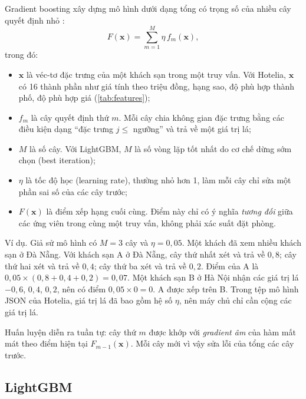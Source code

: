 Gradient boosting xây dựng mô hình dưới dạng tổng có trọng số của nhiều cây quyết định nhỏ \cite{friedman2001}:
\begin{equation}
  F(\mathbf{x}) = \sum_{m=1}^{M} \eta\, f_m(\mathbf{x}),
  \label{eq:gbdt}
\end{equation}
trong đó:
\begin{itemize}
\item $\mathbf{x}$ là véc-tơ đặc trưng của một khách sạn trong một truy vấn. Với Hotelia, $\mathbf{x}$ có 16 thành phần như giá tính theo triệu đồng, hạng sao, độ phù hợp thành phố, độ phù hợp giá (\cref{tab:features});
\item $f_m$ là cây quyết định thứ $m$. Mỗi cây chia không gian đặc trưng bằng các điều kiện dạng ``đặc trưng $j \le$ ngưỡng'' và trả về một giá trị lá;
\item $M$ là số cây. Với LightGBM, $M$ là số vòng lặp tốt nhất do cơ chế dừng sớm chọn (best iteration);
\item $\eta$ là tốc độ học (learning rate), thường nhỏ hơn 1, làm mỗi cây chỉ sửa một phần sai số của các cây trước;
\item $F(\mathbf{x})$ là điểm xếp hạng cuối cùng. Điểm này chỉ có ý nghĩa \emph{tương đối} giữa các ứng viên trong cùng một truy vấn, không phải xác suất đặt phòng.
\end{itemize}

Ví dụ. Giả sử mô hình có $M = 3$ cây và $\eta = 0{,}05$. Một khách đã xem nhiều khách sạn ở Đà Nẵng. Với khách sạn A ở Đà Nẵng, cây thứ nhất xét  và trả về $0{,}8$; cây thứ hai xét  và trả về $0{,}4$; cây thứ ba xét  và trả về $0{,}2$. Điểm của A là $0{,}05 \times (0{,}8 + 0{,}4 + 0{,}2) = 0{,}07$. Một khách sạn B ở Hà Nội nhận các giá trị lá $-0{,}6$, $0{,}4$, $0{,}2$, nên có điểm $0{,}05 \times 0 = 0$. A được xếp trên B. Trong tệp mô hình JSON của Hotelia, giá trị lá đã bao gồm hệ số $\eta$, nên máy chủ chỉ cần cộng các giá trị lá.

Huấn luyện diễn ra tuần tự: cây thứ $m$ được khớp với \emph{gradient âm} của hàm mất mát theo điểm hiện tại $F_{m-1}(\mathbf{x})$. Mỗi cây mới vì vậy sửa lỗi của tổng các cây trước.

\subsection{LightGBM}

